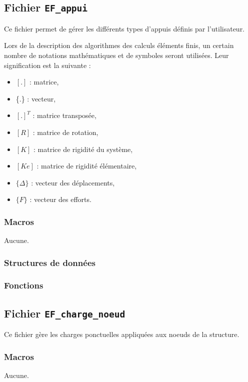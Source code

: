 \documentclass{article}
\begin{document}
\subsection{Fichier {\texttt{EF\_appui}}}
Ce fichier permet de gérer les différents types d'appuis définis par l'utilisateur.\par
Lors de la description des algorithmes des calculs éléments finis, un certain nombre de notations mathématiques et de symboles seront utilisées. Leur signification est la suivante :
\begin{itemize}
\item $[.]$ : matrice,
\item \{.\} : vecteur,
\item $[.]^T$ : matrice transposée,
\item $[R]$ : matrice de rotation,
\item $[K]$ : matrice de rigidité du système,
\item $[Ke]$ : matrice de rigidité élémentaire,
\item $\{\Delta\}$ : vecteur des déplacements,
\item $\{F\}$ : vecteur des efforts.
\end{itemize}
\subsubsection{Macros}
Aucune.
\subsubsection{Structures de données}


\subsubsection{Fonctions}








\subsection{Fichier {\texttt{EF\_charge\_noeud}}}
Ce fichier gère les charges ponctuelles appliquées aux noeuds de la structure.
\subsubsection{Macros}
Aucune.
\end{document}
